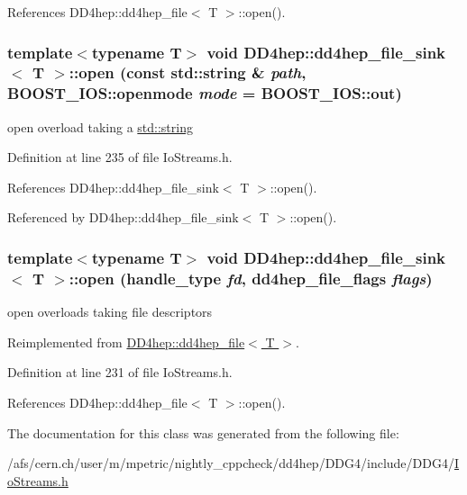 References DD4hep::dd4hep\_\-file$<$ T $>$::open().\hypertarget{class_d_d4hep_1_1dd4hep__file__sink_a5b7bcc7d6d67664ffa22bd8115903a7a}{
\subsubsection[{open}]{\setlength{\rightskip}{0pt plus 5cm}template$<$typename T$>$ void {\bf DD4hep::dd4hep\_\-file\_\-sink}$<$ {\bf T} $>$::open (const std::string \& {\em path}, \/  BOOST\_\-IOS::openmode {\em mode} = {\ttfamily BOOST\_\-IOS::out})}}
\label{class_d_d4hep_1_1dd4hep__file__sink_a5b7bcc7d6d67664ffa22bd8115903a7a}


open overload taking a \hyperlink{classstd_1_1string}{std::string} 

Definition at line 235 of file IoStreams.h.

References DD4hep::dd4hep\_\-file\_\-sink$<$ T $>$::open().

Referenced by DD4hep::dd4hep\_\-file\_\-sink$<$ T $>$::open().\hypertarget{class_d_d4hep_1_1dd4hep__file__sink_a55c1fa794f9474e51d6489496843e358}{
\subsubsection[{open}]{\setlength{\rightskip}{0pt plus 5cm}template$<$typename T$>$ void {\bf DD4hep::dd4hep\_\-file\_\-sink}$<$ {\bf T} $>$::open ({\bf handle\_\-type} {\em fd}, \/  {\bf dd4hep\_\-file\_\-flags} {\em flags})}}
\label{class_d_d4hep_1_1dd4hep__file__sink_a55c1fa794f9474e51d6489496843e358}


open overloads taking file descriptors 

Reimplemented from \hyperlink{class_d_d4hep_1_1dd4hep__file_a5f7da6679da9dbc31f37c85e51d7dd94}{DD4hep::dd4hep\_\-file$<$ T $>$}.

Definition at line 231 of file IoStreams.h.

References DD4hep::dd4hep\_\-file$<$ T $>$::open().

The documentation for this class was generated from the following file:\begin{DoxyCompactItemize}
\item 
/afs/cern.ch/user/m/mpetric/nightly\_\-cppcheck/dd4hep/DDG4/include/DDG4/\hyperlink{_io_streams_8h}{IoStreams.h}\end{DoxyCompactItemize}
